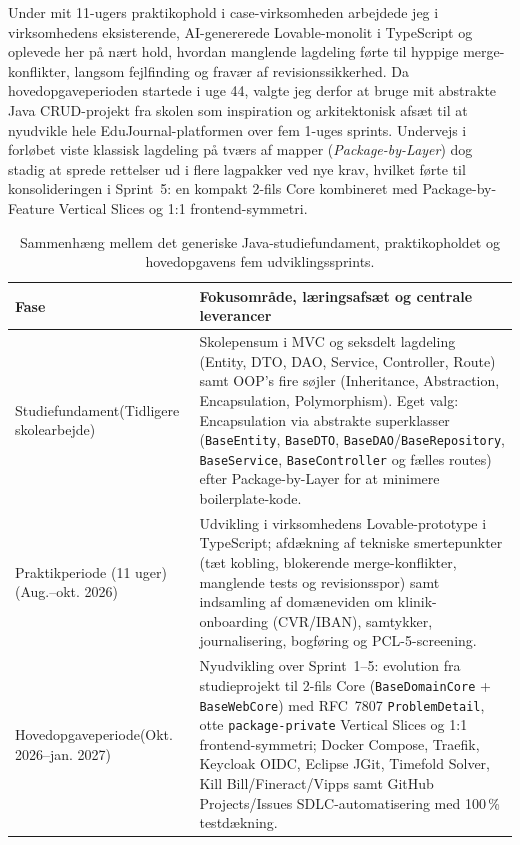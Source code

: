 \documentclass[11pt,a4paper]{article}
\begin{document}
Under mit 11-ugers praktikophold i case-virksomheden arbejdede jeg i virksomhedens eksisterende, AI-genererede Lovable-monolit i TypeScript og oplevede her på nært hold, hvordan manglende lagdeling førte til hyppige merge-konflikter, langsom fejlfinding og fravær af revisionssikkerhed. Da hovedopgaveperioden startede i uge 44, valgte jeg derfor at bruge mit abstrakte Java CRUD-projekt fra skolen som inspiration og arkitektonisk afsæt til at nyudvikle hele EduJournal-platformen over fem 1-uges sprints. Undervejs i forløbet viste klassisk lagdeling på tværs af mapper (\textit{Package-by-Layer}) dog stadig at sprede rettelser ud i flere lagpakker ved nye krav, hvilket førte til konsolideringen i Sprint~5: en kompakt 2-fils Core kombineret med Package-by-Feature Vertical Slices og 1:1 frontend-symmetri.

\begin{table}[H]
\centering
\small
\begin{tabularx}{\textwidth}{P{3.6cm} Y}
\toprule
\textbf{Fase} & \textbf{Fokusområde, læringsafsæt og centrale leverancer} \\
\midrule
Studiefundament\newline (Tidligere skolearbejde) & Skolepensum i MVC og seksdelt lagdeling (Entity, DTO, DAO, Service, Controller, Route) samt OOP's fire søjler (Inheritance, Abstraction, Encapsulation, Polymorphism). Eget valg: Encapsulation via abstrakte superklasser (\texttt{BaseEntity}, \texttt{BaseDTO}, \texttt{BaseDAO}/\texttt{BaseRepository}, \texttt{BaseService}, \texttt{BaseController} og fælles routes) efter Package-by-Layer for at minimere boilerplate-kode. \\
\midrule
Praktikperiode (11 uger)\newline (Aug.--okt. 2026) & Udvikling i virksomhedens Lovable-prototype i TypeScript; afdækning af tekniske smertepunkter (tæt kobling, blokerende merge-konflikter, manglende tests og revisionsspor) samt indsamling af domæneviden om klinik-onboarding (CVR/IBAN), samtykker, journalisering, bogføring og PCL-5-screening. \\
\midrule
Hovedopgaveperiode\newline (Okt. 2026--jan. 2027) & Nyudvikling over Sprint~1--5: evolution fra studieprojekt til 2-fils Core (\texttt{BaseDomainCore} + \texttt{BaseWebCore}) med RFC~7807 \texttt{ProblemDetail}, otte \texttt{package-private} Vertical Slices og 1:1 frontend-symmetri; Docker Compose, Traefik, Keycloak OIDC, Eclipse JGit, Timefold Solver, Kill Bill/Fineract/Vipps samt GitHub Projects/Issues SDLC-automatisering med 100\,\% testdækning. \\
\bottomrule
\end{tabularx}
\caption{Sammenhæng mellem det generiske Java-studiefundament, praktikopholdet og hovedopgavens fem udviklingssprints.}
\label{tab:projektforloeb}
\end{table}
\end{document}
